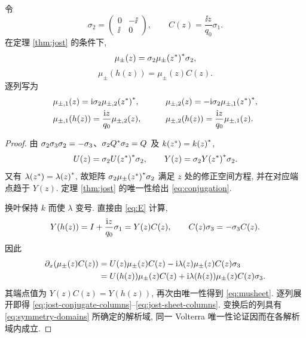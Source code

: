 \begin{proposition}\label{prop:symmetry}
令
\begin{equation*}
\sigma_2=\begin{pmatrix}0&-\ii\\\ii&0\end{pmatrix},\qquad
C(z)=\dfrac{\ii z}{q_0}\sigma_1.
\end{equation*}
在定理 \ref{thm:jost} 的条件下,
\begin{equation}\label{eq:conjugation}
\mu_\pm(z)=\sigma_2{\mu_\pm({z}^{*})}^{*}\sigma_2,
\end{equation}
\begin{equation}\label{eq:musheet}
\mu_\pm(h(z))=\mu_\pm(z)C(z).
\end{equation}
逐列写为
\begin{alignat}{2}
&\mu_{\pm,1}(z)=\mathrm{i}\sigma_2{\mu_{\pm,2}({z}^{*})}^{*},&\qquad
&\mu_{\pm,2}(z)=-\mathrm{i}\sigma_2{\mu_{\pm,1}({z}^{*})}^{*},\label{eq:jost-conjugate-columns}\\
&\mu_{\pm,1}(h(z))=\dfrac{\mathrm{i} z}{q_0}\mu_{\pm,2}(z),&\qquad
&\mu_{\pm,2}(h(z))=\dfrac{\mathrm{i} z}{q_0}\mu_{\pm,1}(z).\label{eq:jost-sheet-columns}
\end{alignat}
\end{proposition}
\begin{proof}
由 $\sigma_2\sigma_3\sigma_2=-\sigma_3$、$\sigma_2{Q}^{*}\sigma_2=Q$ 及 $k({z}^{*})={k(z)}^{*}$,
\begin{equation*}
U(z)=\sigma_2{U({z}^{*})}^{*}\sigma_2,\qquad
Y(z)=\sigma_2{Y({z}^{*})}^{*}\sigma_2.
\end{equation*}
又有 $\lambda({z}^{*})={\lambda(z)}^{*}$, 故矩阵
$\sigma_2{\mu_\pm({z}^{*})}^{*}\sigma_2$ 满足 $z$ 处的修正空间方程,
并在对应端点趋于 $Y(z)$. 定理 \ref{thm:jost} 的唯一性给出 \eqref{eq:conjugation}.

换叶保持 $k$ 而使 $\lambda$ 变号. 直接由 \eqref{eq:E} 计算,
\begin{equation}\label{eq:Esheet}
Y(h(z))=I+\dfrac{\mathrm{i} z}{q_0}\sigma_1=Y(z)C(z),\qquad
C(z)\sigma_3=-\sigma_3 C(z).
\end{equation}
因此
\begin{equation*}
\begin{aligned}
\partial_x(\mu_\pm(z)C(z))
&=U(z)\mu_\pm(z)C(z)-\mathrm{i}\lambda(z)\mu_\pm(z)C(z)\sigma_3\\
&=U(h(z))\mu_\pm(z)C(z)
+\mathrm{i}\lambda(h(z))\mu_\pm(z)C(z)\sigma_3.
\end{aligned}
\end{equation*}
其端点值为 $Y(z)C(z)=Y(h(z))$, 再次由唯一性得到 \eqref{eq:musheet}.
逐列展开即得 \eqref{eq:jost-conjugate-columns}--\eqref{eq:jost-sheet-columns}.
变换后的列具有 \eqref{eq:symmetry-domains} 所确定的解析域,
同一 Volterra 唯一性论证因而在各解析域内成立.
\end{proof}

